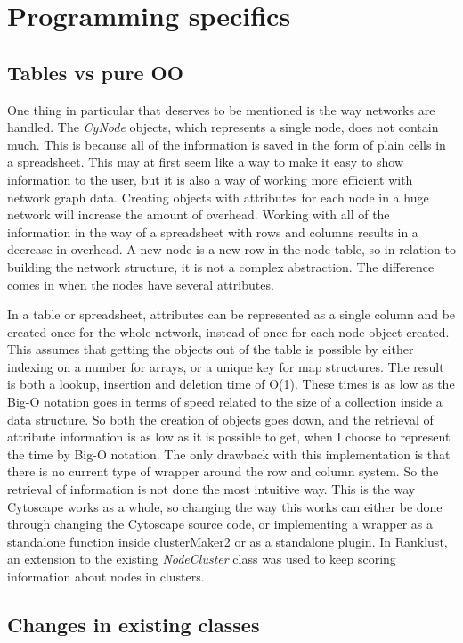 \chapter{Programming specifics}
\section{Tables vs pure OO}
One thing in particular that deserves to be mentioned is the way networks are
handled. The \textit{CyNode} objects, which represents a single node, does not
contain much. This is because all of the information is saved in the form of
plain cells in a spreadsheet. This may at first seem like a way to make it easy
to show information to the user, but it is also a way of working more efficient
with network graph data. Creating objects with attributes for each node in a
huge network will increase the amount of overhead. Working with all of the
information in the way of a spreadsheet with rows and columns results in a
decrease in overhead. A new node is a new row in the node table, so in relation
to building the network structure, it is not a complex abstraction.  The
difference comes in when the nodes have several attributes. 

In a table or spreadsheet, attributes can be represented as a single column and
be created once for the whole network, instead of once for each node object
created. This assumes that getting the objects out of the table is possible by
either indexing on a number for arrays, or a unique key for map structures.
The result is both a lookup, insertion and deletion time of O(1). These times is
as low as the Big-O notation goes in terms of speed related to the size of
a collection inside a data structure. So both the creation of objects goes
down, and the retrieval of attribute information is as low as it is possible to
get, when I choose to represent the time by Big-O notation. The only drawback
with this implementation is that there is no current type of wrapper around the
row and column system. So the retrieval of information is not done the most
intuitive way. This is the way Cytoscape works as a whole, so changing the
way this works can either be done through changing the Cytoscape source code, or
implementing a wrapper as a standalone function inside clusterMaker2 or as
a standalone plugin. In Ranklust, an extension to the existing
\textit{NodeCluster} class was used to keep scoring information about nodes in
clusters.

\section{Changes in existing classes}
